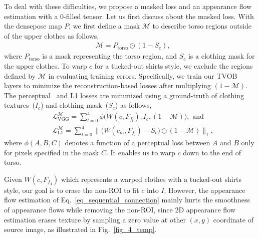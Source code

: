 \documentclass[letterpaper]{article} %
\begin{document}
To deal with these difficulties, we propose a masked loss and an appearance flow estimation with a 0-filled tensor.
Let us first discuss about the masked loss.
With the densepose map $P$, we first define a mask $\mathcal{M}$ to describe torso regions outside of the upper clothes as follows,
\begin{eqnarray}
    & \mathcal{M} = P_{\text{torso}} \odot (1-S_c),
\end{eqnarray}
where $P_{\text{torso}}$ is a mask representing the torso region, and $S_c$ is a clothing mask for the upper clothes.
To warp $c$ for a tucked-out shirts style, we exclude the regions defined by $\mathcal{M}$ in evaluating training errors.
Specifically, we train our TVOB layers to minimize the reconstruction-based losses after multiplying $(1-\mathcal{M})$.
The perceptual~\cite{johnson2016perceptual} and L1 losses are minimized using a ground-truth of clothing textures~($I_c$) and clothing mask~($S_c$) as follows,
\begin{eqnarray}
    & \mathcal{L}_{\text{VGG}}^{\mathcal{M}} = \sum\limits_{l=0}^{4}\phi \big( W(c, F_{f_l}) , I_c, (1-\mathcal{M}) \big), \text{ and} \\
    & \mathcal{L}_{\text{L1}}^{\mathcal{M}} = \sum\limits_{l=0}^{4}\| \big( W(c_m, F_{f_l}) - S_c \big) \odot (1-\mathcal{M}) \|_1,
\end{eqnarray}
where $\phi(A,B,C)$ denotes a function of a perceptual loss between $A$ and $B$ only for pixels specified in the mask $C$.
It enables us to warp $c$ down to the end of torso.

Given $W(c,F_{f_4})$ which represents a warped clothes with a tucked-out shirts style, our goal is to erase the non-ROI to fit $c$ into $I$.
However, the appearance flow estimation of Eq.~\ref{eq_sequential_connection} mainly hurts the smoothness of appearance flows while removing the non-ROI, since 2D appearance flow estimation erases texture by sampling a zero value at other $(x,y)$ coordinate of source image, as illustrated in Fig.~\ref{fig_4_temp}.
\end{document}

